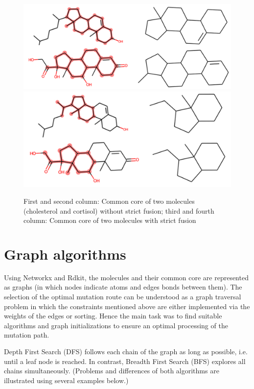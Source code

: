 \begin{figure}
\includegraphics[scale=0.4]{sterols_wo_strictfusion}\includegraphics[scale=0.4]{sterols_w_strictfusion}

\caption{First and second column: Common core of two molecules (cholesterol
and cortisol) without strict fusion; third and fourth column: Common
core of two molecules with strict fusion }

\end{figure}


\section{Graph algorithms}

Using Networkx and Rdkit, the molecules and their common core are
represented as graphs (in which nodes indicate atoms and edges bonds
between them). The selection of the optimal mutation route can be
understood as a graph traversal problem in which the constraints mentioned
above are either implemented via the weights of the edges or sorting.
Hence the main task was to find suitable algorithms and graph initializations
to ensure an optimal processing of the mutation path.

Depth First Search (DFS) follows each chain of the graph as long as
possible, i.e. until a leaf node is reached. In contrast, Breadth
First Search (BFS) explores all chains simultaneously.\cite{Even.2012}
(Problems and differences of both algorithms are illustrated using
several examples below.)


